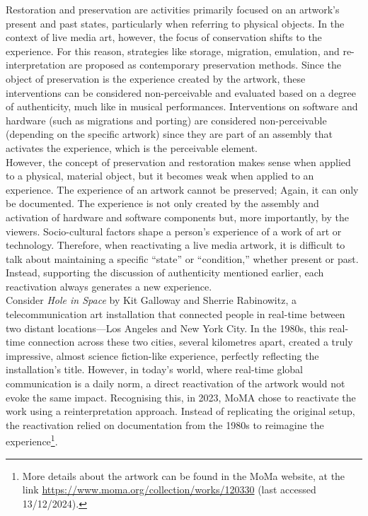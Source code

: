 Restoration and preservation are activities primarily focused on an artwork's present and past states, particularly when referring to physical objects. In the context of live media art, however, the focus of conservation shifts to the experience. For this reason, strategies like storage, migration, emulation, and re-interpretation are proposed as contemporary preservation methods. Since the object of preservation is the experience created by the artwork, these interventions can be considered non-perceivable and evaluated based on a degree of authenticity, much like in musical performances. Interventions on software and hardware (such as migrations and porting) are considered non-perceivable (depending on the specific artwork) since they are part of an assembly that activates the experience, which is the perceivable element.\\
However, the concept of preservation and restoration makes sense when applied to a physical, material object, but it becomes weak when applied to an experience. The experience of an artwork cannot be preserved; Again, it can only be documented. The experience is not only created by the assembly and activation of hardware and software components but, more importantly, by the viewers. Socio-cultural factors shape a person's experience of a work of art or technology. Therefore, when reactivating a live media artwork, it is difficult to talk about maintaining a specific ``state'' or ``condition,'' whether present or past. Instead, supporting the discussion of authenticity mentioned earlier, each reactivation always generates a new experience.\\
Consider \textit{Hole in Space} by Kit Galloway and Sherrie Rabinowitz, a telecommunication art installation that connected people in real-time between two distant locations—Los Angeles and New York City. In the 1980s, this real-time connection across these two cities, several kilometres apart, created a truly impressive, almost science fiction-like experience, perfectly reflecting the installation’s title. However, in today’s world, where real-time global communication is a daily norm, a direct reactivation of the artwork would not evoke the same impact. Recognising this, in 2023, MoMA chose to reactivate the work using a reinterpretation approach. Instead of replicating the original setup, the reactivation relied on documentation from the 1980s to reimagine the experience\footnote{More details about the artwork can be found in the MoMa website, at the link \url{https://www.moma.org/collection/works/120330} (last accessed 13/12/2024).}.\\
